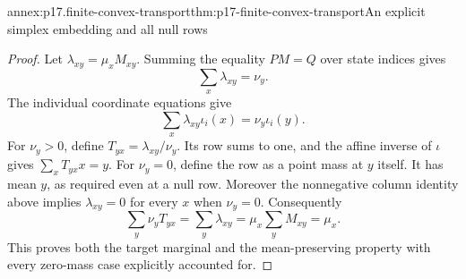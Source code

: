 \begin{annexitem}{annex:p17.finite-convex-transport}{thm:p17-finite-convex-transport}{An explicit simplex embedding and all null rows}
\begin{proof}
Let \(\lambda_{xy}=\mu_xM_{xy}\).
Summing the equality \(PM=Q\) over state indices gives
\[
                   \sum_x\lambda_{xy}=\nu_y.
\]
The individual coordinate equations give
\[
                   \sum_x\lambda_{xy}\iota_i(x)
                              =\nu_y\iota_i(y).
\]
For \(\nu_y>0\), define \(T_{yx}=\lambda_{xy}/\nu_y\).
Its row sums to one, and the affine inverse of \(\iota\) gives
\(\sum_xT_{yx}x=y\). For \(\nu_y=0\), define the row as a point
mass at \(y\) itself. It has mean \(y\), as required even at a null row.
Moreover the nonnegative column identity above implies
\(\lambda_{xy}=0\) for every \(x\) when \(\nu_y=0\).
Consequently
\[
 \sum_y\nu_yT_{yx}
   =\sum_y\lambda_{xy}
   =\mu_x\sum_yM_{xy}
   =\mu_x.
\]
This proves both the target marginal and the mean-preserving property
with every zero-mass case explicitly accounted for.
\end{proof}
\end{annexitem}


